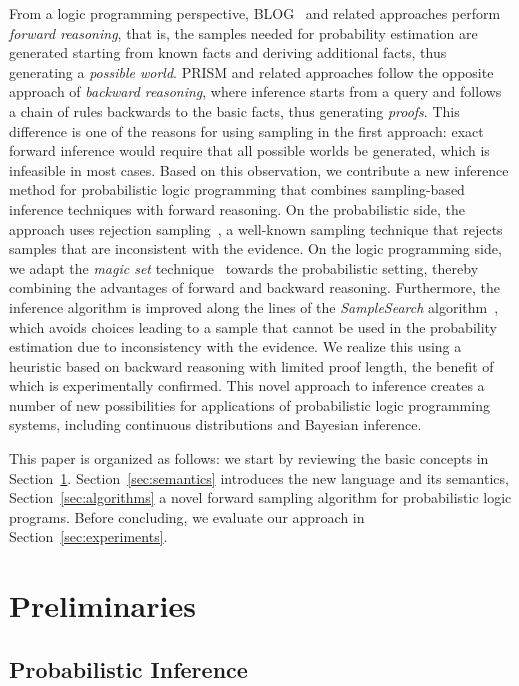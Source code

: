 \documentclass{tlp}
\begin{document}
From a logic programming perspective, BLOG~\cite{milch:aistats2005}
and related approaches perform \emph{forward reasoning}, that is, the
samples needed for probability estimation are generated starting from
known facts and deriving additional facts, thus generating a
\emph{possible world}. PRISM and related approaches follow the
opposite approach of \emph{backward reasoning}, where inference starts
from a query and follows a chain of rules backwards to the basic
facts, thus generating \emph{proofs}. This difference is one of the
reasons for using sampling in the first approach: exact forward
inference would require that all possible worlds be generated, which
is infeasible in most cases.  Based on this observation, we contribute
a new inference method for probabilistic logic programming that
combines sampling-based inference techniques with forward
reasoning. On the probabilistic side, the approach uses rejection
sampling~\cite{KollerFriedman09}, a well-known sampling technique that
rejects samples that are inconsistent with the evidence.  On the logic
programming side, we adapt the \emph{magic set}
technique~\cite{bancilhon} towards the probabilistic setting, thereby
combining the advantages of forward and backward
reasoning. Furthermore, the inference algorithm is improved along the
lines of the \emph{SampleSearch}
algorithm~\cite{Gogate09samplesearch:importance}, which avoids choices
leading to a sample that cannot be used in the probability estimation
due to inconsistency with the evidence. We realize this using a
heuristic based on backward reasoning with limited proof length, the
benefit of which is experimentally confirmed.  This novel approach to
inference creates a number of new possibilities for applications of
probabilistic logic programming systems, including continuous
distributions and Bayesian inference.

This paper is organized as follows: we start by reviewing the basic
concepts in Section~\ref{sec:prelim}.  Section~\ref{sec:semantics}
introduces the new language and its semantics,
Section~\ref{sec:algorithms} a novel forward sampling algorithm for
probabilistic logic programs. Before concluding, we evaluate our
approach in Section~\ref{sec:experiments}.


\section{Preliminaries}
\label{sec:prelim}
\subsection{Probabilistic Inference} 
\label{sec:probinf}
\end{document}
